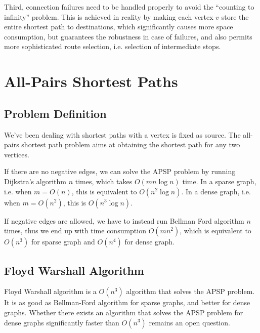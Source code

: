Third, connection failures need to be handled properly to avoid the ``counting to infinity'' problem. This is achieved in reality by making each vertex $v$ store the entire shortest path to destinations, which significantly causes more space consumption, but guarantees the robustness in case of failures, and also permits more sophisticated route selection, i.e. selection of intermediate stops.
\section{All-Pairs Shortest Paths}
\subsection{Problem Definition}
We've been dealing with shortest paths with a vertex is fixed as source. The all-pairs shortest path problem aims at obtaining the shortest path for any two vertices.
\begin{description}
\end{description}
If there are no negative edges, we can solve the APSP problem by running Dijkstra's algorithm $n$ times, which takes $O(mn\log n)$ time. In a sparse graph, i.e. when $m=O(n)$, this is equivalent to $O(n^2\log n)$. In a dense graph, i.e. when $m=O(n^2)$, this is $O(n^3\log n)$. 

If negative edges are allowed, we have to instead run Bellman Ford algorithm $n$ times, thus we end up with time consumption $O(mn^2)$, which is equivalent to $O(n^3)$ for sparse graph and $O(n^4)$ for dense graph.
\subsection{Floyd Warshall Algorithm}
Floyd Warshall algorithm is a $O(n^3)$ algorithm that solves the APSP problem. It is as good as Bellman-Ford algorithm for sparse graphs, and better for dense graphs. Whether there exists an algorithm that solves the APSP problem for dense graphs significantly faster than $O(n^3)$ remains an open question.

